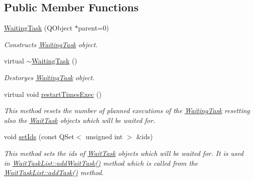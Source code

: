 \subsection*{Public Member Functions}
\begin{DoxyCompactItemize}
\item 
\hyperlink{class_waiting_task_a806640941e34cbe8fb356404ddb79d82}{Waiting\+Task} (Q\+Object $\ast$parent=0)
\begin{DoxyCompactList}\small\item\em Constructs \hyperlink{class_waiting_task}{Waiting\+Task} object. \end{DoxyCompactList}\item 
\hypertarget{class_waiting_task_a13afb2c5c57743d62345598b47b18f34}{}virtual \hyperlink{class_waiting_task_a13afb2c5c57743d62345598b47b18f34}{$\sim$\+Waiting\+Task} ()\label{class_waiting_task_a13afb2c5c57743d62345598b47b18f34}

\begin{DoxyCompactList}\small\item\em Destoryes \hyperlink{class_waiting_task}{Waiting\+Task} object. \end{DoxyCompactList}\item 
\hypertarget{class_waiting_task_afd06aa0d4a845eaa705f8893cd0d87a3}{}virtual void \hyperlink{class_waiting_task_afd06aa0d4a845eaa705f8893cd0d87a3}{restart\+Times\+Exec} ()\label{class_waiting_task_afd06aa0d4a845eaa705f8893cd0d87a3}

\begin{DoxyCompactList}\small\item\em This method resets the number of planned executions of the \hyperlink{class_waiting_task}{Waiting\+Task} resetting also the \hyperlink{class_wait_task}{Wait\+Task} objects which will be waited for. \end{DoxyCompactList}\item 
void \hyperlink{class_waiting_task_a5123ece4b96ec9229d01d28db64094fa}{set\+Ids} (const Q\+Set$<$ unsigned int $>$ \&ids)
\begin{DoxyCompactList}\small\item\em This method sets the ids of \hyperlink{class_wait_task}{Wait\+Task} objects which will be waited for. It is used in \hyperlink{class_wait_task_list_a2724cb9d9e7f897a4bf0c44054ad2c29}{Wait\+Task\+List\+::add\+Wait\+Task()} method which is called from the \hyperlink{class_wait_task_list_a429d0b45f82a2eef00c5dacffbbc1f70}{Wait\+Task\+List\+::add\+Task()} method. \end{DoxyCompactList}\end{DoxyCompactItemize}
